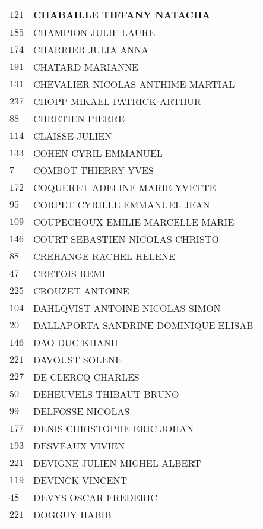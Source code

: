 \begin{xltabular}{\linewidth}{|l|X|}
    \hline
    $121$ & CHABAILLE TIFFANY NATACHA \\
    \hline
    $185$ & CHAMPION JULIE LAURE \\
    \hline
    $174$ & CHARRIER JULIA ANNA \\
    \hline
    $191$ & CHATARD MARIANNE \\
    \hline
    $131$ & CHEVALIER NICOLAS ANTHIME MARTIAL \\
    \hline
    $237$ & CHOPP MIKAEL PATRICK ARTHUR \\
    \hline
    $88$ & CHRETIEN PIERRE \\
    \hline
    $114$ & CLAISSE JULIEN \\
    \hline
    $133$ & COHEN CYRIL EMMANUEL \\
    \hline
    $7$ & COMBOT THIERRY YVES \\
    \hline
    $172$ & COQUERET ADELINE MARIE YVETTE \\
    \hline
    $95$ & CORPET CYRILLE EMMANUEL JEAN \\
    \hline
    $109$ & COUPECHOUX EMILIE MARCELLE MARIE \\
    \hline
    $146$ & COURT SEBASTIEN NICOLAS CHRISTO \\
    \hline
    $88$ & CREHANGE RACHEL HELENE \\
    \hline
    $47$ & CRETOIS REMI \\
    \hline
    $225$ & CROUZET ANTOINE \\
    \hline
    $104$ & DAHLQVIST ANTOINE NICOLAS SIMON \\
    \hline
    $20$ & DALLAPORTA SANDRINE DOMINIQUE ELISAB \\
    \hline
    $146$ & DAO DUC KHANH \\
    \hline
    $221$ & DAVOUST SOLENE \\
    \hline
    $227$ & DE CLERCQ CHARLES \\
    \hline
    $50$ & DEHEUVELS THIBAUT BRUNO \\
    \hline
    $99$ & DELFOSSE NICOLAS \\
    \hline
    $177$ & DENIS CHRISTOPHE ERIC JOHAN \\
    \hline
    $193$ & DESVEAUX VIVIEN \\
    \hline
    $221$ & DEVIGNE JULIEN MICHEL ALBERT \\
    \hline
    $119$ & DEVINCK VINCENT \\
    \hline
    $48$ & DEVYS OSCAR FREDERIC \\
    \hline
    $221$ & DOGGUY HABIB \\

\end{xltabular}
